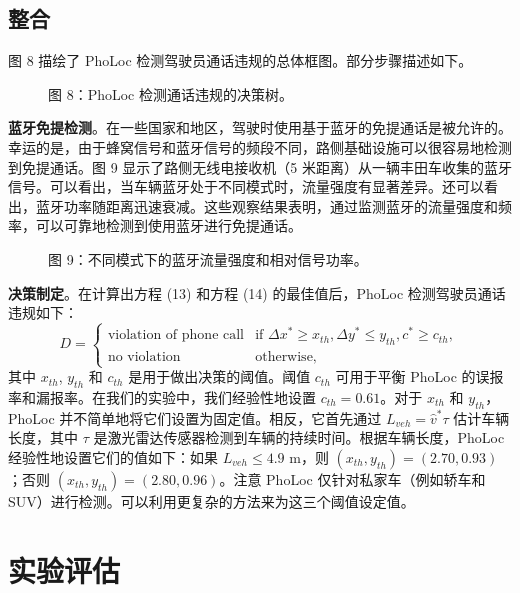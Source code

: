 \documentclass[journal, onecolumn]{IEEEtran}
\begin{document}
\subsection{整合}
图 8 描绘了 PhoLoc 检测驾驶员通话违规的总体框图。部分步骤描述如下。

\begin{figure}[htbp]
\centering
\caption{图 8：PhoLoc 检测通话违规的决策树。}
\label{fig:8}
\end{figure}

\textbf{蓝牙免提检测}。在一些国家和地区，驾驶时使用基于蓝牙的免提通话是被允许的。幸运的是，由于蜂窝信号和蓝牙信号的频段不同，路侧基础设施可以很容易地检测到免提通话。图 9 显示了路侧无线电接收机（5 米距离）从一辆丰田车收集的蓝牙信号。可以看出，当车辆蓝牙处于不同模式时，流量强度有显著差异。还可以看出，蓝牙功率随距离迅速衰减。这些观察结果表明，通过监测蓝牙的流量强度和频率，可以可靠地检测到使用蓝牙进行免提通话。

\begin{figure}[htbp]
\centering
\caption{图 9：不同模式下的蓝牙流量强度和相对信号功率。}
\label{fig:9}
\end{figure}

\textbf{决策制定}。在计算出方程 (13) 和方程 (14) 的最佳值后，PhoLoc 检测驾驶员通话违规如下：
\begin{equation}
D = \begin{cases} 
\text{violation of phone call} & \text{if } \Delta x^{*}\ge x_{th}, \Delta y^{*}\le y_{th}, c^{*}\ge c_{th}, \\
\text{no violation} & \text{otherwise},
\end{cases}
\end{equation}
其中 $x_{th}$, $y_{th}$ 和 $c_{th}$ 是用于做出决策的阈值。阈值 $c_{th}$ 可用于平衡 PhoLoc 的误报率和漏报率。在我们的实验中，我们经验性地设置 $c_{th}=0.61$。对于 $x_{th}$ 和 $y_{th}$，PhoLoc 并不简单地将它们设置为固定值。相反，它首先通过 $L_{veh}=\hat{v}^{*}\tau$ 估计车辆长度，其中 $\tau$ 是激光雷达传感器检测到车辆的持续时间。根据车辆长度，PhoLoc 经验性地设置它们的值如下：如果 $L_{veh}\le4.9$ m，则 $(x_{th},y_{th})=(2.70,0.93)$；否则 $(x_{th},y_{th})=(2.80,0.96)$。注意 PhoLoc 仅针对私家车（例如轿车和 SUV）进行检测。可以利用更复杂的方法来为这三个阈值设定值。

\section{实验评估}
\end{document}
